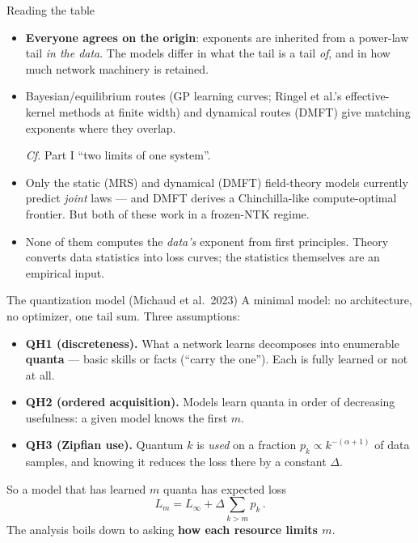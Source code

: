 \documentclass[11pt]{beamer}
\newcommand{\hl}[1]{{\color{blue!60!black}\textbf{#1}}}
\begin{document}
\begin{frame}{Reading the table}
  \begin{itemize}
    \item \hl{Everyone agrees on the origin}: exponents are inherited
      from a power-law tail \emph{in the data}. %
      The models
      differ in what the tail is a tail \emph{of}, and in how much
      network machinery is retained.
    \item Bayesian/equilibrium routes (GP learning curves; Ringel et
      al.'s effective-kernel methods at finite width) and dynamical
      routes (DMFT) give matching exponents where they overlap.
      
      \emph{Cf.} Part I ``two limits of one system''.
    \item Only the static (MRS) and dynamical (DMFT) field-theory models
      currently predict \emph{joint} laws --- and DMFT derives a
      Chinchilla-like compute-optimal frontier. But both of these work in a frozen-NTK regime.
    \item None of them computes the \emph{data's} exponent from first
      principles. Theory converts data statistics into loss curves; the
      statistics themselves are an empirical input.
  \end{itemize}
\end{frame}

\begin{frame}{The quantization model (Michaud et al.\ 2023)}
  A minimal model: no architecture, no optimizer, one tail sum. Three
  assumptions:
  \begin{itemize}
    \item \textbf{QH1 (discreteness).} What a network learns decomposes
      into enumerable \hl{quanta} --- basic skills or facts (``carry
      the one''). Each is fully learned or not at all.
    \item \textbf{QH2 (ordered acquisition).} Models learn quanta in
      order of decreasing usefulness: a given model knows the first $m$.
    \item \textbf{QH3 (Zipfian use).} Quantum $k$ is \emph{used} on a
      fraction $p_k \propto k^{-(\alpha+1)}$ of data samples, and knowing it
      reduces the loss there by a constant $\Delta$.
  \end{itemize}
  So a model that has learned $m$ quanta has expected loss
  \[
    L_m = L_\infty + \Delta \sum_{k > m} p_k\,.
  \]
  The analysis boils down to asking \hl{how each
  resource limits $m$}.
\end{frame}
\end{document}
